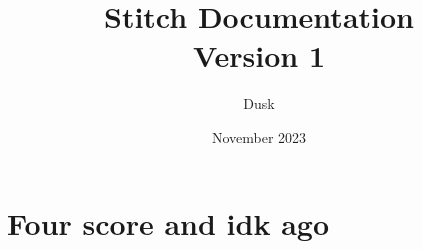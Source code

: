 \documentclass{report}
\title{Stitch Documentation \\ \large Version 1}
\author{Dusk}
\date{November 2023}
\begin{document}
\maketitle

\section{Four score and idk ago}
\end{document}
